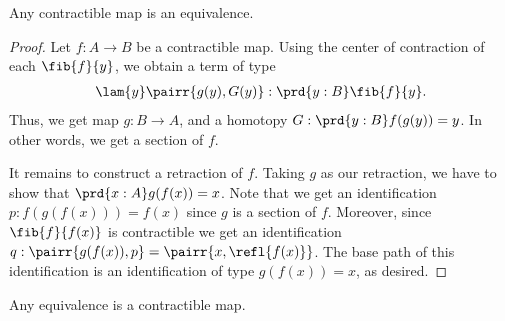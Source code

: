 \begin{thm}\label{thm:equiv_contr}
Any contractible map is an equivalence.
\end{thm}

\begin{proof}
Let $f:A\to B$ be a contractible map. Using the center of contraction of each $\fib{f}{y}$, we obtain a term of type
\begin{align*}
\lam{y}\pairr{g(y),G(y)}:\prd{y:B}\fib{f}{y}.
\end{align*}
Thus, we get map $g:B\to A$, and a homotopy $G:\prd{y:B} f(g(y))=y$. In other words, we get a section of $f$.

It remains to construct a retraction of $f$. Taking $g$ as our retraction, we have to show that $\prd{x:A} g(f(x))=x$. Note that we get an identification $p:f(g(f(x)))=f(x)$ since $g$ is a section of $f$. Moreover, since $\fib{f}{f(x)}$ is contractible we get an identification $q:\pairr{g(f(x)),p}=\pairr{x,\refl{f(x)}}$. The base path of this identification is an identification of type $g(f(x))=x$, as desired.
\end{proof}

\begin{thm}\label{thm:contr_equiv}
Any equivalence is a contractible map.
\end{thm}

